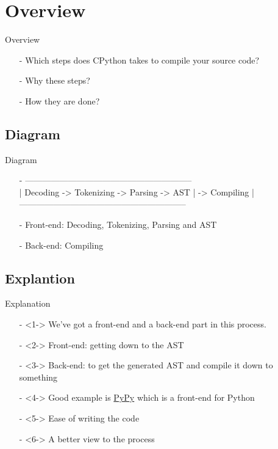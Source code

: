 \section{Overview}
\begin{frame}{Overview}
    \begin{itemize}
        \item[-]
        Which steps does CPython takes to compile your source code?
        \item[-]
        Why these steps?
        \item[-]
        How they are done?
    \end{itemize}
\end{frame}

\subsection{Diagram}
\begin{frame}{Diagram}
    \begin{itemize}
        \item[-] 
        {\small \ttfamily 
            ----------------------------------------------------------- \\
            | Decoding -> Tokenizing -> Parsing -> AST | -> Compiling | \\
            ----------------------------------------------------------- \\
        }
        
        \item[-]
        Front-end: Decoding, Tokenizing, Parsing and AST
        
        \item[-]
        Back-end: Compiling
    \end{itemize}
\end{frame}

\subsection{Explantion}
\begin{frame}{Explanation}
    \begin{itemize}
        \item[-]<1->
        We’ve got a front-end and a back-end part in this process.
        
        \item[-]<2->
        Front-end: getting down to the AST
        
        \item[-]<3->
        Back-end: to get the generated AST and compile it down to something
        
        \item[-]<4->
        Good example is \href{https://www.pypy.org/}{PyPy} which is a front-end for Python
        
        \item[-]<5->
        Ease of writing the code
        
        \item[-]<6->
        A better view to the process
    \end{itemize}
\end{frame}
